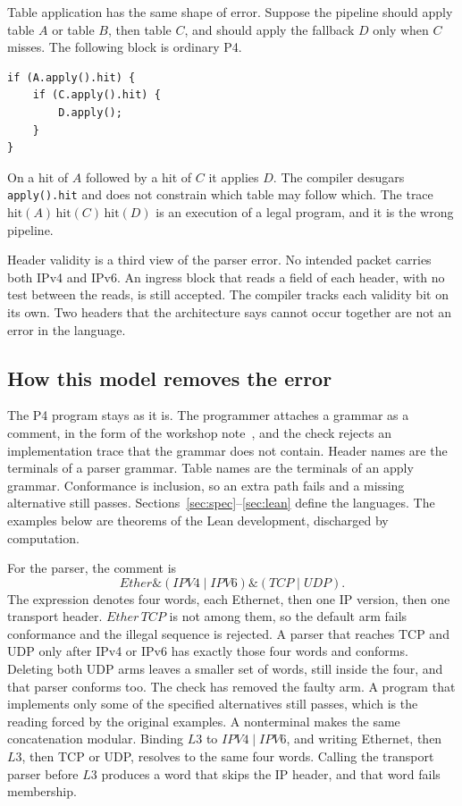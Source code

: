 \documentclass[a4paper,UKenglish,cleveref,autoref]{lipics-v2021}
\begin{document}
Table application has the same shape of error.
Suppose the pipeline should apply table \(A\) or table \(B\), then table \(C\), and should apply the fallback \(D\) only when \(C\) misses.
The following block is ordinary P4.
\begin{lstlisting}[basicstyle=\scriptsize\ttfamily,columns=fullflexible,keepspaces=true,
  aboveskip=0.7em,belowskip=0.55em,xleftmargin=1.4em,framesep=0pt,frame=none]
if (A.apply().hit) {
    if (C.apply().hit) {
        D.apply();
    }
}
\end{lstlisting}
On a hit of \(A\) followed by a hit of \(C\) it applies \(D\).
The compiler desugars \texttt{apply().hit} and does not constrain which table may follow which.
The trace \(\mathrm{hit}(A)\,\mathrm{hit}(C)\,\mathrm{hit}(D)\) is an execution of a legal program, and it is the wrong pipeline.

Header validity is a third view of the parser error.
No intended packet carries both IPv4 and IPv6.
An ingress block that reads a field of each header, with no test between the reads, is still accepted.
The compiler tracks each validity bit on its own.
Two headers that the architecture says cannot occur together are not an error in the language.

\subsection{How this model removes the error}

The P4 program stays as it is.
The programmer attaches a grammar as a comment, in the form of the workshop note~\cite{yuan2025fmano}, and the check rejects an implementation trace that the grammar does not contain.
Header names are the terminals of a parser grammar.
Table names are the terminals of an apply grammar.
Conformance is inclusion, so an extra path fails and a missing alternative still passes.
Sections~\ref{sec:spec}--\ref{sec:lean} define the languages.
The examples below are theorems of the Lean development, discharged by computation.

For the parser, the comment is
\[
  \mathit{Ether} \mathbin{\&} (\mathit{IPV4} \mid \mathit{IPV6}) \mathbin{\&} (\mathit{TCP} \mid \mathit{UDP}).
\]
The expression denotes four words, each Ethernet, then one IP version, then one transport header.
\(\mathit{Ether}\,\mathit{TCP}\) is not among them, so the default arm fails conformance and the illegal sequence is rejected.
A parser that reaches TCP and UDP only after IPv4 or IPv6 has exactly those four words and conforms.
Deleting both UDP arms leaves a smaller set of words, still inside the four, and that parser conforms too.
The check has removed the faulty arm.
A program that implements only some of the specified alternatives still passes, which is the reading forced by the original examples.
A nonterminal makes the same concatenation modular.
Binding \(\mathit{L3}\) to \(\mathit{IPV4} \mid \mathit{IPV6}\), and writing Ethernet, then \(\mathit{L3}\), then TCP or UDP, resolves to the same four words.
Calling the transport parser before \(\mathit{L3}\) produces a word that skips the IP header, and that word fails membership.
\end{document}
